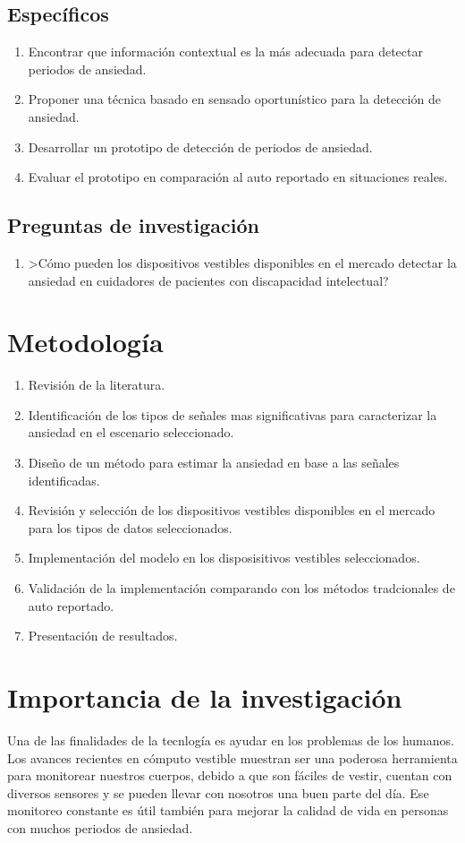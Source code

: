 \documentclass[letterpaper,12pt]{cicese}
\begin{document}
			\section{Espec\'ificos}
				\begin{enumerate}
					\item Encontrar que informaci\'on contextual es la m\'as adecuada para detectar periodos de ansiedad.
					\item Proponer una t\'ecnica basado en sensado oportun\'istico para la detecci\'on de ansiedad.
					\item Desarrollar un prototipo de detecci\'on de periodos de ansiedad.
					\item Evaluar el prototipo en comparaci\'on al auto reportado en situaciones reales.
				\end{enumerate}
			\section{Preguntas de investigaci\'on}
				\begin{enumerate}
					\item >C\'omo pueden los dispositivos vestibles disponibles en el mercado detectar la ansiedad en cuidadores de pacientes con discapacidad intelectual?
				\end{enumerate}
		\chapter{Metodolog\'ia}
				\begin{enumerate}
					\item Revisi\'on de la literatura.
					\item Identificaci\'on de los tipos de se\~nales mas significativas para caracterizar la ansiedad en el escenario seleccionado.
					\item Dise\~no de un m\'etodo para estimar la ansiedad en base a las se\~nales identificadas.
					\item Revisi\'on y selecci\'on de los dispositivos vestibles disponibles en el mercado para los tipos de datos seleccionados.
					\item Implementaci\'on del modelo en los disposisitivos vestibles seleccionados.
					\item Validaci\'on de la implementaci\'on comparando con los m\'etodos tradcionales de auto reportado. 
					\item Presentaci\'on de resultados.
				\end{enumerate}
		\chapter{Importancia de la investigaci\'on}
				Una de las finalidades de la tecnlog\'ia es ayudar en los problemas de los humanos. Los avances recientes en c\'omputo vestible muestran
				ser una poderosa herramienta para monitorear nuestros cuerpos, debido a que son f\'aciles de vestir, cuentan con diversos sensores y se pueden
				llevar con nosotros una buen parte del d\'ia. Ese monitoreo constante es \'util tambi\'en para mejorar la calidad de vida en personas con muchos periodos de ansiedad. %
				
\end{document}
